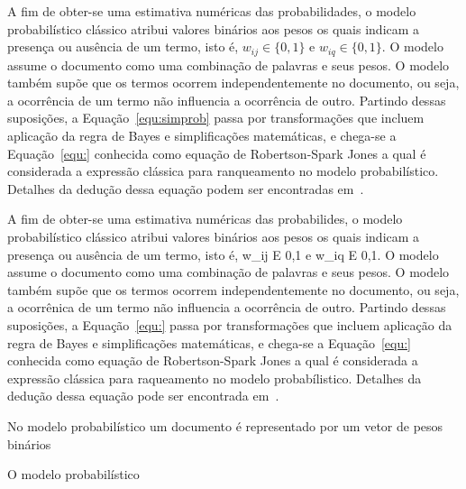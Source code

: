 A fim de obter-se uma estimativa numéricas das probabilidades, o modelo probabilístico clássico atribui valores binários aos pesos os quais indicam a presença ou ausência de um termo, isto é, $w_{ij} \in \{0,1\}$ e $w_{iq} \in \{0,1\}$. 
O modelo assume o documento como uma combinação de palavras e seus pesos. 
O modelo também supõe que os termos ocorrem independentemente no documento, ou seja, a ocorrência de um termo não influencia a ocorrência de outro. 
Partindo dessas suposições, a Equação~\ref{equ:simprob} passa por transformações que incluem aplicação da regra de Bayes e simplificações matemáticas, e chega-se a Equação~\ref{equ:} conhecida como equação de Robertson-Spark Jones a qual é considerada a expressão clássica para ranqueamento no modelo probabilístico. Detalhes da dedução dessa equação podem ser encontradas
em~\cite{ Croft2009, Manning2008, Rijsbergen1979}.






















A fim de obter-se uma estimativa numéricas das probabilides, o modelo probabilístico clássico atribui valores binários aos pesos os quais indicam a presença ou ausência de um termo, isto é, w_ij E {0,1} e w_iq E {0,1}. 
O modelo assume o documento como uma combinação de palavras e seus pesos. 
O modelo também supõe que os termos ocorrem independentemente no documento, ou seja, a ocorrênica de um termo não influencia a ocorrência de outro. 
Partindo dessas suposições, a Equação~\ref{equ:} passa por transformações que incluem aplicação da regra de Bayes e simplificações matemáticas, e chega-se a Equação~\ref{equ:} conhecida como equação de Robertson-Spark Jones a qual é considerada a expressão clássica para raqueamento no modelo probabílistico. Detalhes da dedução dessa equação pode ser encontrada em~\cite{}.





No modelo probabilístico um documento é representado por um vetor de pesos binários 



O modelo probabilístico

